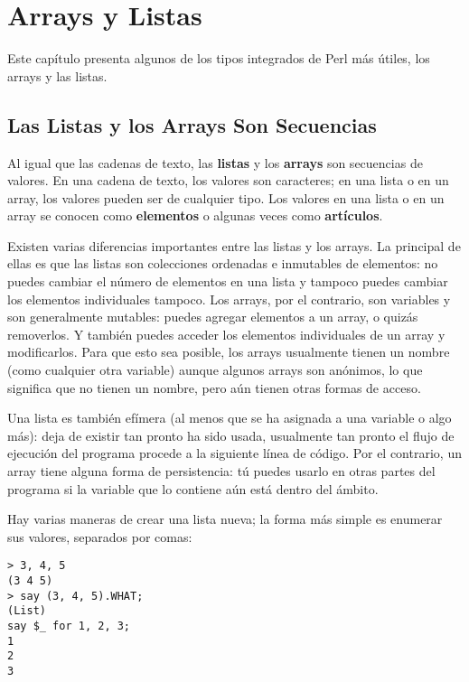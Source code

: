 

\chapter{Arrays y Listas}
\label{arrays}

Este capítulo presenta algunos de los tipos integrados
de Perl más útiles, los arrays y las listas.


\section{Las Listas y los Arrays Son Secuencias}
\label{sequence}

Al igual que las cadenas de texto, las {\bf listas} y los {\bf arrays}
son secuencias de valores. En una cadena de texto, los valores son
caracteres; en una lista o en un array, los valores pueden ser
de cualquier tipo. Los valores en una lista o en un array se 
conocen  como {\bf elementos} o algunas veces como {\bf artículos}.

Existen varias diferencias importantes entre las listas y los arrays.
La principal de ellas es que las listas son colecciones ordenadas e inmutables
de elementos: no puedes cambiar el número de elementos en una lista y tampoco puedes
cambiar los elementos individuales tampoco. Los arrays, por el contrario,
son variables y son generalmente mutables: puedes agregar elementos 
a un array, o quizás removerlos. Y también puedes acceder los
elementos individuales de un array y modificarlos. Para que esto sea
posible, los arrays usualmente tienen un nombre (como cualquier otra variable)
aunque algunos arrays son anónimos, lo que significa que no tienen 
un nombre, pero aún tienen otras formas de acceso.

Una lista es también efímera (al menos que se ha asignada a una
variable o algo más): deja de existir tan pronto ha sido usada,
usualmente tan pronto el flujo de ejecución del programa procede
a la siguiente línea de código. Por el contrario, un array tiene
alguna forma de persistencia: tú puedes usarlo en otras partes del
programa si la variable que lo contiene aún está dentro del
ámbito.

Hay varias maneras de crear una lista nueva;
la forma más simple es enumerar sus valores, separados
por comas:

\begin{lstlisting}
> 3, 4, 5
(3 4 5)
> say (3, 4, 5).WHAT;
(List)
say $_ for 1, 2, 3;
1
2
3
\end{lstlisting}
%

